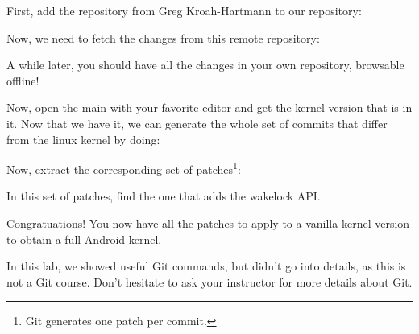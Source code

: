 First, add the  repository from Greg Kroah-Hartmann
to our repository:


Now, we need to fetch the changes from this remote repository:


A while later, you should have all the changes in your own repository,
browsable offline!

Now, open the main  with your favorite editor and get
the kernel version that is in it. Now that we have it, we can generate
the whole set of commits that differ from the linux kernel by doing:


Now, extract the corresponding set of patches\footnote{Git generates
  one patch per commit.}:


In this set of patches, find the one that adds the wakelock API.

Congratuations! You now have all the patches to apply to a vanilla
kernel version to obtain a full Android kernel.

In this lab, we showed useful Git commands, but didn't go into
details, as this is not a Git course. Don't hesitate to ask your
instructor for more details about Git.
